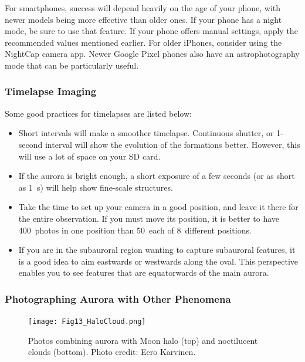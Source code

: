 \documentclass{article}
\begin{document}
For smartphones, success will depend heavily on the age of your phone, with newer models being more effective than older ones. If your phone has a night mode, be sure to use that feature. If your phone offers manual settings, apply the recommended values mentioned earlier. For older iPhones, consider using the NightCap camera app. Newer Google Pixel phones also have an astrophotography mode that can be particularly useful.

\subsubsection{Timelapse Imaging}

Some good practices for timelapses are listed below: 
\begin{itemize}
    \item Short intervals will make a smoother timelapse. Continuous shutter, or 1-second interval will show the evolution of the formations better. However, this will use a lot of space on your SD card.
    \item If the aurora is bright enough, a short exposure of a few seconds (or as short as 1~s) will help show fine-scale structures.
    \item Take the time to set up your camera in a good position, and leave it there for the entire observation. If you must move its position, it is better to have 400~photos in one position than 50~each of 8~different positions.
    \item If you are in the subauroral region wanting to capture subauroral features, it is a good idea to aim eastwards or westwards along the oval. This perspective enables you to see features that are equatorwards of the main aurora.
    
\end{itemize}

\subsubsection{Photographing Aurora with Other Phenomena}

\begin{figure}[h!]
\begin{centering}
  \texttt{[image: Fig13\_HaloCloud.png]}
  \caption{Photos combining aurora with Moon halo (top) and noctilucent clouds (bottom). Photo credit: Eero Karvinen.}
  \label{fig-aurorahalonlc}
  \end{centering}
\end{figure}
\end{document}
